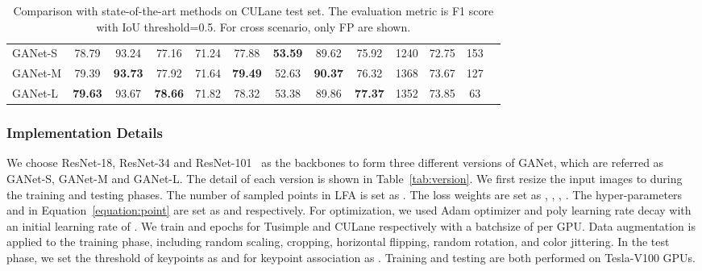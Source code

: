 \documentclass[10pt,twocolumn,letterpaper]{article}
\begin{document}
\begin{table*}[t]
\begin{center}
{\begin{tabular}{lcccccccccccc}
            \rowcolor{mygray}
            GANet-S           & 78.79 & 93.24 & 77.16 & 71.24 & 77.88 & \textbf{53.59}  & 89.62 & 75.92 & 1240 & 72.75 & 153 \\
            \rowcolor{mygray}
            GANet-M           & 79.39 & \textbf{93.73} & 77.92 & 71.64 &  \textbf{79.49} & 52.63 & \textbf{90.37} & 76.32  &  1368 & 73.67 & 127 \\
            \rowcolor{mygray}
            GANet-L           & \textbf{79.63} &  93.67 & \textbf{78.66} & 71.82 & 78.32 & 53.38  & 89.86 & \textbf{77.37} & 1352 & 73.85 & 63 \\  \hline
        \end{tabular}
    }
    \caption{Comparison with state-of-the-art methods on CULane test set. The evaluation metric is F1 score with IoU threshold=0.5. For cross scenario, only FP are shown.}
    \label{tab:culane}
    \end{center}
\end{table*}

\subsubsection{Implementation Details}
We choose ResNet-18, ResNet-34 and ResNet-101~\cite{He_2016_CVPR} as the backbones to form three different versions of GANet, which are referred as GANet-S, GANet-M and GANet-L. The detail of each version is shown in Table~\ref{tab:version}.
We first resize the input images to  during the training and testing phases. The number of sampled points in LFA is set as . The loss weights are set as , , , . 
The hyper-parameters  and  in Equation~\ref{equation:point} are set as  and  respectively. 
For optimization, we used Adam optimizer and poly learning rate decay with an initial learning rate of . We train  and  epochs for Tusimple and CULane respectively with a batchsize of  per GPU. Data augmentation is applied to the training phase, including random scaling, cropping, horizontal flipping, random rotation, and color jittering. In the test phase, we set the threshold of keypoints as  and  for keypoint association as . Training and testing are both performed on Tesla-V100 GPUs.
\end{document}
